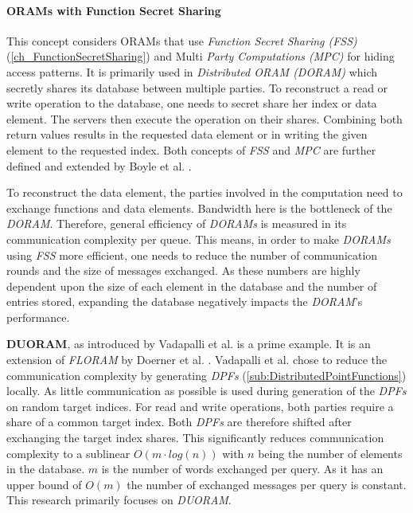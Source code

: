 \paragraph{ORAMs with Function Secret Sharing}\label{par:oramsWithFSS}
This concept considers ORAMs that use \textit{Function Secret Sharing (FSS)} (\ref{ch_FunctionSecretSharing}) and Multi \textit{Party Computations (MPC)} for hiding access patterns.
It is primarily used in \textit{Distributed ORAM (DORAM)} which secretly shares its database between multiple parties.
To reconstruct a read or write operation to the database, one needs to secret share her index or data element.
The servers then execute the operation on their shares.
Combining both return values results in the requested data element or in writing the given element to the requested index.
Both concepts of \textit{FSS} and \textit{MPC} are further defined and extended by Boyle et al. \cite{boyle2015function,boyle2016function,boyle2021function,boyle2023information}.

To reconstruct the data element, the parties involved in the computation need to exchange functions and data elements.
Bandwidth here is the bottleneck of the \textit{DORAM}.
Therefore, general efficiency of \textit{DORAMs} is measured in its communication complexity per queue.
This means, in order to make \textit{DORAMs} using \textit{FSS} more efficient, one needs to reduce the number of communication rounds and the size of messages exchanged.
As these numbers are highly dependent upon the size of each element in the database and the number of entries stored, expanding the database negatively impacts the \textit{DORAM}'s performance.

\textbf{DUORAM}, as introduced by Vadapalli et al. \cite{vadapalli2023duoram} is a prime example.
It is an extension of \textit{FLORAM} by Doerner et al. \cite{doerner2017scale}.
Vadapalli et al. \cite{vadapalli2023duoram} chose to reduce the communication complexity by generating \textit{DPFs} (\ref{sub:DistributedPointFunctions}) locally.
As little communication as possible is used during generation of the \textit{DPFs} on random target indices.
For read and write operations, both parties require a share of a common target index.   
Both \textit{DPFs} are therefore shifted after exchanging the target index shares.
This significantly reduces communication complexity to a sublinear $O(m\cdot log(n))$ with $n$ being the number of elements in the database.
$m$ is the number of words exchanged per query.
As it has an upper bound of $O(m)$ the number of exchanged messages per query is constant.
This research primarily focuses on \textit{DUORAM}.

